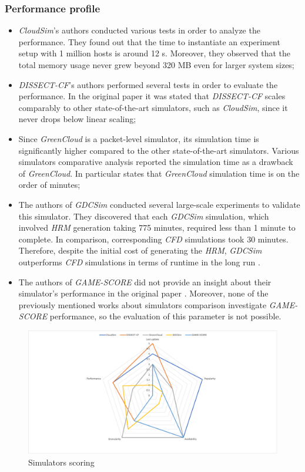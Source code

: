 {\subsubsection{Performance profile}
\begin{itemize}
    \item \emph{CloudSim}'s authors conducted various tests in order to analyze the performance. They found out that the time to instantiate an experiment setup with 1 million hosts is around 12 s. Moreover, they observed that the total memory usage never grew beyond 320 MB even for larger system sizes;
    \item \emph{DISSECT-CF}'s authors performed several tests in order to evaluate the performance. In the original paper it was stated that \emph{DISSECT-CF} scales comparably to other state-of-the-art simulators, such as \emph{CloudSim}, since it never drops below linear scaling;
    \item Since \emph{GreenCloud} is a packet-level simulator, its simulation time is significantly higher compared to the other state-of-the-art simulators. Various simulators comparative analysis reported the simulation time as a drawback of \emph{GreenCloud}. In particular \cite{khalil2017cloud} states that \emph{GreenCloud} simulation time is on the order of minutes;
    \item The authors of \emph{GDCSim} conducted several large-scale experiments to validate this simulator. They discovered that each \emph{GDCSim} simulation, which involved \emph{HRM} generation taking 775 minutes, required less than 1 minute to complete. In comparison, corresponding \emph{CFD} simulations took 30 minutes. Therefore, despite the initial cost of generating the \emph{HRM}, \emph{GDCSim} outperforms \emph{CFD} simulations in terms of runtime in the long run \cite{gupta2014gdcsim}.
    \item The authors of \emph{GAME-SCORE} did not provide an insight about their simulator's performance in the original paper \cite{fernandez2019game}. Moreover, none of the previously mentioned works about simulators comparison investigate \emph{GAME-SCORE} performance, so the evaluation of this parameter is not possible. 
\end{itemize}

\begin{figure}[h]
    \centering
    \includegraphics[width=1\textwidth]{chapters/images/simulators_scoring.png}
    \caption{Simulators scoring}
    \label{fig:radar}
\end{figure}

}
